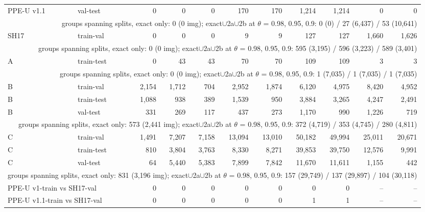 \begin{table}[t]
\begin{tabular}{ll r rr rr rr rr}
PPE-U v1.1 & val-test & 0 & 0 & 0 & 170 & 170 & 1{,}214 & 1{,}214 & 0 & 0 \\
\multicolumn{11}{r}{\scriptsize groups spanning splits, exact only: 0 (0 img); exact$\cup$2a$\cup$2b at $\theta$ = 0.98, 0.95, 0.9: 0 (0) / 27 (6{,}437) / 53 (10{,}641)} \\
\midrule
SH17 & train-val & 0 & 0 & 0 & 9 & 9 & 127 & 127 & 1{,}660 & 1{,}626 \\
\multicolumn{11}{r}{\scriptsize groups spanning splits, exact only: 0 (0 img); exact$\cup$2a$\cup$2b at $\theta$ = 0.98, 0.95, 0.9: 595 (3{,}195) / 596 (3{,}223) / 589 (3{,}401)} \\
\midrule
A & train-test & 0 & 43 & 43 & 70 & 70 & 109 & 109 & 3 & 3 \\
\multicolumn{11}{r}{\scriptsize groups spanning splits, exact only: 0 (0 img); exact$\cup$2a$\cup$2b at $\theta$ = 0.98, 0.95, 0.9: 1 (7{,}035) / 1 (7{,}035) / 1 (7{,}035)} \\
\midrule
B & train-val & 2{,}154 & 1{,}712 & 704 & 2{,}952 & 1{,}874 & 6{,}120 & 4{,}975 & 8{,}420 & 4{,}952 \\
B & train-test & 1{,}088 & 938 & 389 & 1{,}539 & 950 & 3{,}884 & 3{,}265 & 4{,}247 & 2{,}491 \\
B & val-test & 331 & 269 & 117 & 437 & 273 & 1{,}170 & 990 & 1{,}226 & 719 \\
\multicolumn{11}{r}{\scriptsize groups spanning splits, exact only: 573 (2{,}441 img); exact$\cup$2a$\cup$2b at $\theta$ = 0.98, 0.95, 0.9: 372 (4{,}719) / 353 (4{,}745) / 280 (4{,}811)} \\
\midrule
C & train-val & 1{,}491 & 7{,}207 & 7{,}158 & 13{,}094 & 13{,}010 & 50{,}182 & 49{,}994 & 25{,}011 & 20{,}671 \\
C & train-test & 810 & 3{,}804 & 3{,}763 & 8{,}330 & 8{,}271 & 39{,}853 & 39{,}750 & 12{,}576 & 9{,}991 \\
C & val-test & 64 & 5{,}440 & 5{,}383 & 7{,}899 & 7{,}842 & 11{,}670 & 11{,}611 & 1{,}155 & 442 \\
\multicolumn{11}{r}{\scriptsize groups spanning splits, exact only: 831 (3{,}196 img); exact$\cup$2a$\cup$2b at $\theta$ = 0.98, 0.95, 0.9: 157 (29{,}749) / 137 (29{,}897) / 104 (30{,}118)} \\
\midrule
\multicolumn{2}{l}{PPE-U v1-train vs SH17-val} & 0 & 0 & 0 & 0 & 0 & 0 & 0 & -- & -- \\
\multicolumn{2}{l}{PPE-U v1.1-train vs SH17-val} & 0 & 0 & 0 & 0 & 0 & 1 & 1 & -- & -- \\
\bottomrule
\end{tabular}
\end{table}